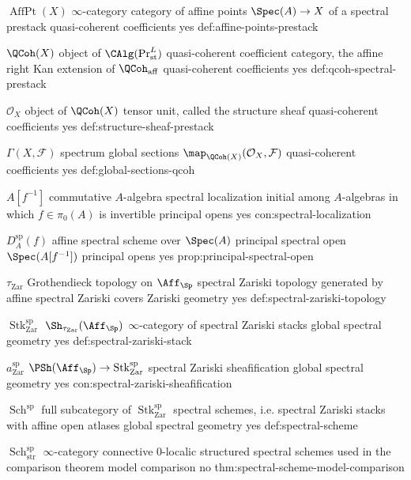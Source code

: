 \begin{longtable}
\CanonicalEntry
{\(\operatorname{AffPt}(X)\)}
{\(\infty\)-category}
{category of affine points \(\Spec(A)\to X\) of a spectral prestack}
{quasi-coherent coefficients}
{yes}
{def:affine-points-prestack}

\CanonicalEntry
{\(\QCoh(X)\)}
{object of \(\CAlg(\Pr^L_{\mathrm{st}})\)}
{quasi-coherent coefficient category, the affine right Kan extension of \(\QCoh_{\mathrm{aff}}\)}
{quasi-coherent coefficients}
{yes}
{def:qcoh-spectral-prestack}

\CanonicalEntry
{\(\mathcal O_X\)}
{object of \(\QCoh(X)\)}
{tensor unit, called the structure sheaf}
{quasi-coherent coefficients}
{yes}
{def:structure-sheaf-prestack}

\CanonicalEntry
{\(\Gamma(X,\mathcal F)\)}
{spectrum}
{global sections \(\map_{\QCoh(X)}(\mathcal O_X,\mathcal F)\)}
{quasi-coherent coefficients}
{yes}
{def:global-sections-qcoh}

\CanonicalEntry
{\(A[f^{-1}]\)}
{commutative \(A\)-algebra}
{spectral localization initial among \(A\)-algebras in which \(f\in\pi_0(A)\) is invertible}
{principal opens}
{yes}
{con:spectral-localization}

\CanonicalEntry
{\(D_A^{\mathrm{sp}}(f)\)}
{affine spectral scheme over \(\Spec(A)\)}
{principal spectral open \(\Spec(A[f^{-1}])\)}
{principal opens}
{yes}
{prop:principal-spectral-open}

\CanonicalEntry
{\(\tau_{\mathrm{Zar}}\)}
{Grothendieck topology on \(\Aff_{\Sp}\)}
{spectral Zariski topology generated by affine spectral Zariski covers}
{Zariski geometry}
{yes}
{def:spectral-zariski-topology}

\CanonicalEntry
{\(\operatorname{Stk}^{\mathrm{sp}}_{\mathrm{Zar}}\)}
{\(\Sh_{\tau_{\mathrm{Zar}}}(\Aff_{\Sp})\)}
{\(\infty\)-category of spectral Zariski stacks}
{global spectral geometry}
{yes}
{def:spectral-zariski-stack}

\CanonicalEntry
{\(a^{\mathrm{sp}}_{\mathrm{Zar}}\)}
{\(\PSh(\Aff_{\Sp})\to\operatorname{Stk}^{\mathrm{sp}}_{\mathrm{Zar}}\)}
{spectral Zariski sheafification}
{global spectral geometry}
{yes}
{con:spectral-zariski-sheafification}

\CanonicalEntry
{\(\operatorname{Sch}^{\mathrm{sp}}\)}
{full subcategory of \(\operatorname{Stk}^{\mathrm{sp}}_{\mathrm{Zar}}\)}
{spectral schemes, i.e. spectral Zariski stacks with affine open atlases}
{global spectral geometry}
{yes}
{def:spectral-scheme}

\CanonicalEntry
{\(\operatorname{Sch}^{\mathrm{sp}}_{\mathrm{str}}\)}
{\(\infty\)-category}
{connective \(0\)-localic structured spectral schemes used in the comparison theorem}
{model comparison}
{no}
{thm:spectral-scheme-model-comparison}


\end{longtable}
